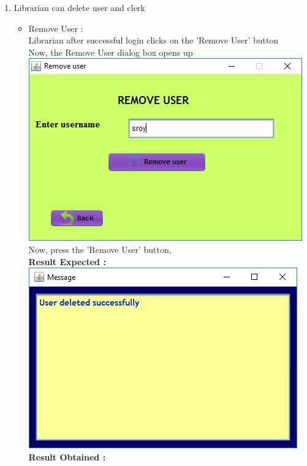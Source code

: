 \documentclass{article}
\begin{document}
\begin{enumerate}
\begin{itemize}
\end{itemize}
\item Librarian can delete user and clerk
\begin{itemize}
\item Remove User :\\
Librarian after successful login clicks on the 'Remove User' button\\
Now, the Remove User dialog box opens up\\
\includegraphics[scale=0.8]{images/LibrarianLogin/Actions/DeleteUser/DeleteUserScreen.PNG}\\
Now, press the 'Remove User' button,\\
\textbf{Result Expected :}\\
\includegraphics[scale=0.8]{images/LibrarianLogin/Actions/DeleteUser/UserDeleted.PNG}\\
\textbf{Result Obtained :}\\

\end{itemize}
\end{enumerate}
\end{document}
